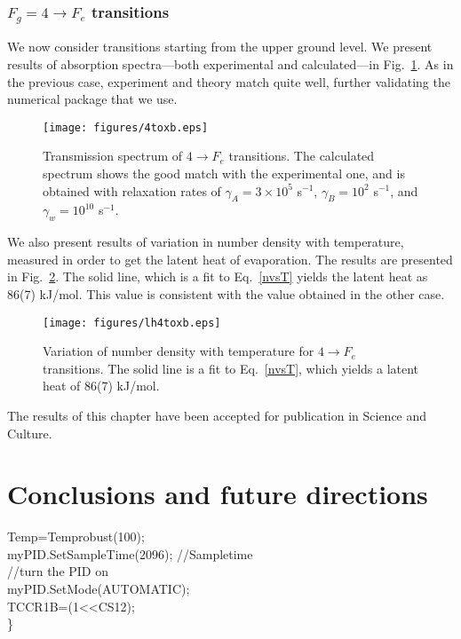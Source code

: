 	\subsection{$ F_g = 4 \rightarrow F_e $ transitions}
	
	We now consider transitions starting from the upper ground level. We present results of absorption spectra---both experimental and calculated---in Fig.~\ref{4tox}. As in the previous case, experiment and theory match quite well, further validating the numerical package that we use.
	
	\begin{figure}[h]
		\centering
		\texttt{[image: figures/4toxb.eps]}
		\caption{Transmission spectrum of $ 4 \rightarrow F_e $ transitions. The calculated spectrum shows the good match with the experimental one, and is obtained with relaxation rates of  $ \gamma_A = 3 \times 10^5 $ s$^{-1}$, $ \gamma_B = 10^2 $ s$^{-1}$, and $ \gamma_w = 10^{10} $ s$^{-1}$.}
		\label{4tox}
	\end{figure}
	
	We also present results of variation in number density with temperature, measured in order to get the latent heat of evaporation. The results are presented in Fig.~\ref{lh4tox}. The solid line, which is a fit to Eq.~\eqref{nvsT} yields the latent heat as 86(7) kJ/mol. This value is consistent with the value obtained in the other case.
	
	\begin{figure}[h]
		\centering
		\texttt{[image: figures/lh4toxb.eps]}
		\caption{Variation of number density with temperature for $ 4 \rightarrow F_e $ transitions. The solid line is a fit to Eq.~\eqref{nvsT}, which yields a latent heat of 86(7) kJ/mol.}
		\label{lh4tox}
	\end{figure}
\clearpage
The results of this chapter have been accepted for publication in Science and Culture.

\chapter{Conclusions and future directions}	

	Temp=Temprobust(100);\\
	myPID.SetSampleTime(2096); //Sampletime\\
	//turn the PID on\\
	myPID.SetMode(AUTOMATIC);\\
	TCCR1B\textbar=(1\textless\textless CS12);\\
\}\\


